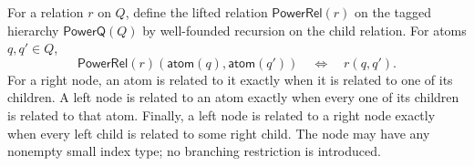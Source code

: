 \begin{definition}
For a relation $r$ on $Q$, define the lifted relation
$\mathsf{PowerRel}(r)$ on the tagged hierarchy $\mathsf{PowerQ}(Q)$ by
well-founded recursion on the child relation.  For atoms $q,q'\in Q$,
\[
\mathsf{PowerRel}(r)(\mathsf{atom}(q),\mathsf{atom}(q'))
\quad\Longleftrightarrow\quad r(q,q').
\]
For a right node, an atom is related to it exactly when it is related to one
of its children.  A left node is related to an atom exactly when every one of
its children is related to that atom.  Finally, a left node is related to a
right node exactly when every left child is related to some right child.
The node may have any nonempty small index type; no branching restriction is
introduced.
\end{definition}
